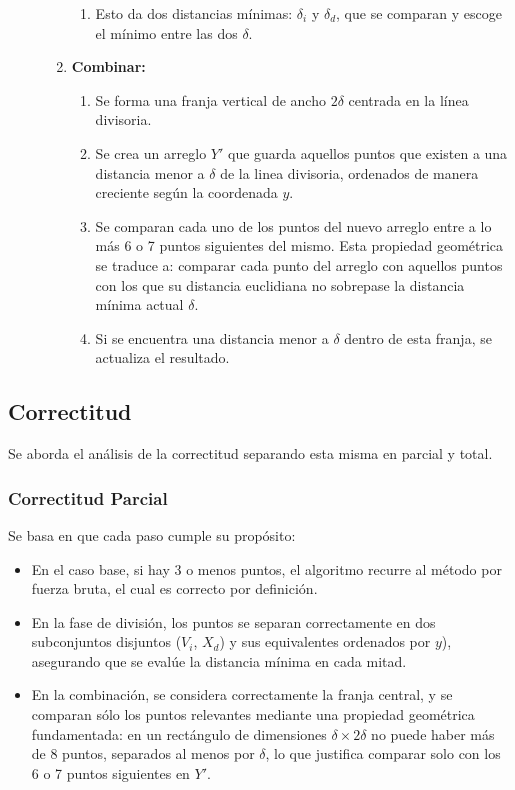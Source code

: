 \documentclass[main.tex]{subfiles}
\begin{document}
\begin{description}
\begin{enumerate}
\begin{enumerate}
			            \item Esto da dos distancias mínimas: $\delta_i$ y $\delta_d$, que se
			                  comparan y escoge el mínimo entre las dos $\delta$.
		            \end{enumerate}
		      \item \textbf{Combinar:}
		            \begin{enumerate}
			            \item Se forma una franja vertical de ancho $2\delta$ centrada en la línea divisoria.
			            \item Se crea un arreglo $Y'$ que guarda aquellos puntos que existen a una distancia menor
			                  a $\delta$ de la linea divisoria, ordenados de manera creciente según la coordenada $y$.
			            \item Se comparan cada uno de los puntos del nuevo arreglo entre a lo más
			                  6 o 7 puntos siguientes del mismo. Esta propiedad geométrica se
			                  traduce a: comparar cada punto del arreglo con aquellos puntos con
			                  los que su distancia euclidiana no sobrepase la distancia mínima
			                  actual $\delta$.
			            \item Si se encuentra una distancia menor a $\delta$ dentro de esta franja,
			                  se actualiza el resultado.
		            \end{enumerate}
	      \end{enumerate}
\end{description}

\subsection{Correctitud}

Se aborda el análisis de la correctitud separando esta misma en parcial y total.

\subsubsection{\textbf{Correctitud Parcial}}
Se basa en que cada paso cumple su propósito:

\begin{itemize}
	\item  En el caso base, si hay 3 o menos puntos, el algoritmo recurre al método por fuerza
	      bruta, el cual es correcto por definición.
	\item En la fase de división, los puntos se separan correctamente en dos subconjuntos disjuntos
	      ($V_i$, $X_d$) y sus equivalentes ordenados por $y$), asegurando que se evalúe la
	      distancia mínima en cada mitad.
	\item En la combinación, se considera correctamente la franja central, y se comparan sólo
	      los  puntos relevantes mediante una propiedad geométrica fundamentada: en un
	      rectángulo de dimensiones $\delta \times 2\delta$ no puede haber más de 8 puntos,
	      separados al menos por $\delta$, lo que justifica comparar solo con los 6 o 7 puntos
	      siguientes en $Y'$.
\end{itemize}
\end{document}
